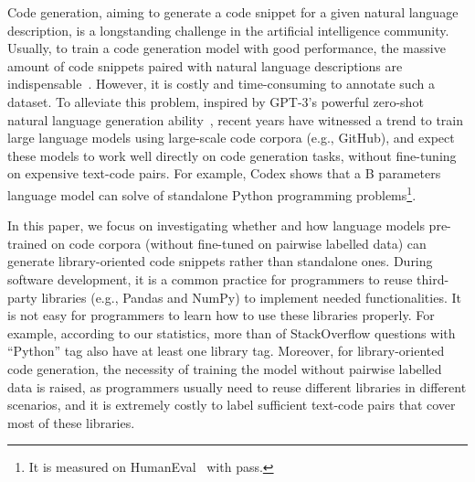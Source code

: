 \documentclass{article}
\newcommand{\pandas}{Pandas\xspace}
\newcommand{\numpy}{NumPy\xspace}
\begin{document}
Code generation, aiming to generate a code snippet for a given natural language description, is a longstanding challenge in the artificial intelligence community. Usually, to train a code generation model with good performance, the massive amount of code snippets paired with natural language descriptions are indispensable~\cite{sun2019grammar,lu2021codexglue}. However, it is costly and time-consuming to annotate such a dataset. To alleviate this problem, inspired by GPT-3's powerful zero-shot natural language generation ability~\cite{brown2020language}, recent years have witnessed a trend to train large language models using large-scale code corpora (e.g., GitHub), and expect these models to work well directly on code generation tasks, without fine-tuning on expensive text-code pairs.
For example, Codex shows that a B parameters language model can solve  of standalone Python programming problems\footnote{It is measured on HumanEval~\cite{chen2021evaluating} with pass.}.


In this paper, we focus on investigating whether and how language models pre-trained on code corpora (without fine-tuned on pairwise labelled data) can generate library-oriented code snippets rather than standalone ones.
During software development, it is a common practice for programmers to reuse third-party libraries (e.g., \pandas and \numpy) to implement needed functionalities.
It is not easy for programmers to learn how to use these libraries properly. For example, according to our statistics, more than  of StackOverflow questions with ``Python'' tag also have at least one library tag.
Moreover, for library-oriented code generation, the necessity of training the model without pairwise labelled data is raised, as programmers usually need to reuse different libraries in different scenarios, and it is extremely costly to label sufficient text-code pairs that cover most of these libraries.
\end{document}
